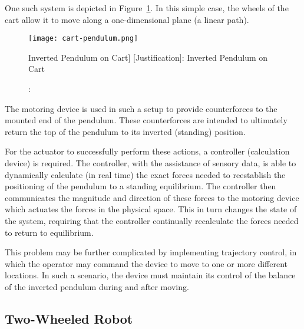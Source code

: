 \documentclass[crop=false,float=true,class=scrartcl]{standalone}
\begin{document}
One such system is depicted in Figure~\ref{FIG:justification:invertedPendulum}.
In this simple case, the wheels of the cart allow it to move along a one-dimensional plane {\fns(a linear path)}.  

\vspace*{\fill}
\begin{figure}[H]
\centering
\texttt{[image: cart-pendulum.png]}
\caption[[Justification]: Inverted Pendulum on Cart]
        {[Justification]: Inverted Pendulum on Cart\footnotemark}
\label{FIG:justification:invertedPendulum}
\end{figure}
\vspace*{\fill}





\clearpage




The motoring device is used in such a setup to provide counterforces to the mounted end of the pendulum.
These counterforces are intended to ultimately return the top of the pendulum to its inverted {\fns(standing)} position.

For the actuator to successfully perform these actions, a controller {\fns(calculation device)} is required.
The controller, with the assistance of sensory data, is able to dynamically calculate {\fns(in real time)} 
the exact forces needed to reestablish the positioning of the pendulum to a standing equilibrium.
The controller then communicates the magnitude and direction of these forces to the motoring device 
which actuates the forces in the physical space.
This in turn changes the state of the system, 
requiring that the controller continually recalculate the forces needed to return to equilibrium.

This problem may be further complicated by implementing trajectory control,
in which the operator may command the device to move to one or more different locations.
In such a scenario, the device must maintain its control of the balance of the inverted pendulum
during and after moving.




\clearpage




\subsection{Two-Wheeled Robot}
\label{SEC:justification:twoWheeledRobot}
\end{document}
